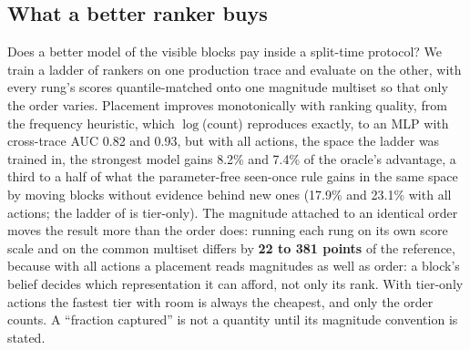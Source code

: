 \subsection{What a better ranker buys}
\label{sec:capacity}
Does a better model of the visible blocks pay inside a split-time protocol? We train a ladder of
rankers on one production trace and evaluate on the other, with every rung's scores quantile-matched
onto one magnitude multiset so that only the order varies. Placement improves monotonically with
ranking quality, from the frequency heuristic, which $\log$(count) reproduces exactly, to an MLP with
cross-trace AUC 0.82 and 0.93, but with all actions, the space the ladder was trained in, the strongest
model gains 8.2\% and 7.4\% of the oracle's advantage, a third to a half of what the parameter-free
seen-once rule gains in the same space by moving blocks without evidence behind new ones (17.9\% and
23.1\% with all actions; the ladder of  is tier-only). The magnitude attached to an identical order moves the
result more than the order does: running each rung on its own score scale and on the common multiset
differs by \textbf{22 to 381 points} of the reference, because with all actions a placement reads
magnitudes as well as order: a block's belief decides which representation it can afford, not only its
rank. With tier-only actions the fastest tier with room is always the cheapest, and only the order counts. A ``fraction captured'' is not a quantity until
its magnitude convention is stated.
